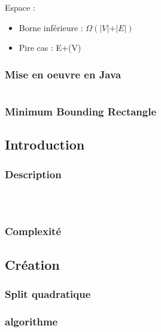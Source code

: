     Espace :
    \begin{itemize}
        \item Borne inférieure :
        $\Omega{\displaystyle (\vert V\vert +\vert E\vert )}$

        \item Pire cas :
            {\vert E\vert +{}(\vert V\vert )}

    \end{itemize}
    \subsubsection{Mise en oeuvre en Java }

    \begin{lstlisting}[language=java]
    \end{lstlisting}

    \newpage

    \subsubsection{Minimum Bounding Rectangle}
    \subsection{Introduction}


    \subsubsection{Description}
  \\
    \begin{lstlisting}[language=java]

    \end{lstlisting}

    \subsubsection{Complexité}
    \newpage

    \subsection{Création}
    \subsubsection{Split quadratique}
    \label{sec:Quadratique_introduction}

    \subsubsection{algorithme}


